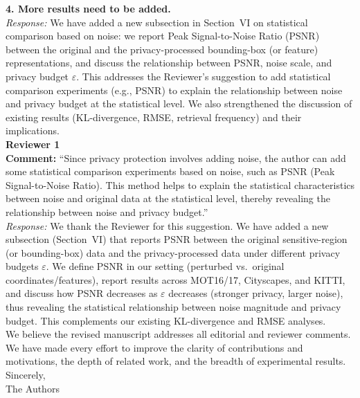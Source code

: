 \noindent\textbf{4. More results need to be added.}\\
\textit{Response:} We have added a new subsection in Section~VI on statistical comparison based on noise: we report Peak Signal-to-Noise Ratio (PSNR) between the original and the privacy-processed bounding-box (or feature) representations, and discuss the relationship between PSNR, noise scale, and privacy budget $\varepsilon$. This addresses the Reviewer's suggestion to add statistical comparison experiments (e.g., PSNR) to explain the relationship between noise and privacy budget at the statistical level. We also strengthened the discussion of existing results (KL-divergence, RMSE, retrieval frequency) and their implications.\\

\vspace{0.5em}
\noindent\textbf{Reviewer 1}\\

\noindent\textbf{Comment:} ``Since privacy protection involves adding noise, the author can add some statistical comparison experiments based on noise, such as PSNR (Peak Signal-to-Noise Ratio). This method helps to explain the statistical characteristics between noise and original data at the statistical level, thereby revealing the relationship between noise and privacy budget.''\\
\textit{Response:} We thank the Reviewer for this suggestion. We have added a new subsection (Section~VI) that reports PSNR between the original sensitive-region (or bounding-box) data and the privacy-processed data under different privacy budgets $\varepsilon$. We define PSNR in our setting (perturbed vs.\ original coordinates/features), report results across MOT16/17, Cityscapes, and KITTI, and discuss how PSNR decreases as $\varepsilon$ decreases (stronger privacy, larger noise), thus revealing the statistical relationship between noise magnitude and privacy budget. This complements our existing KL-divergence and RMSE analyses.\\

\vspace{0.5em}
\noindent We believe the revised manuscript addresses all editorial and reviewer comments. We have made every effort to improve the clarity of contributions and motivations, the depth of related work, and the breadth of experimental results.\\

\vspace{0.5em}
\noindent Sincerely,\\
\noindent The Authors

\clearpage
